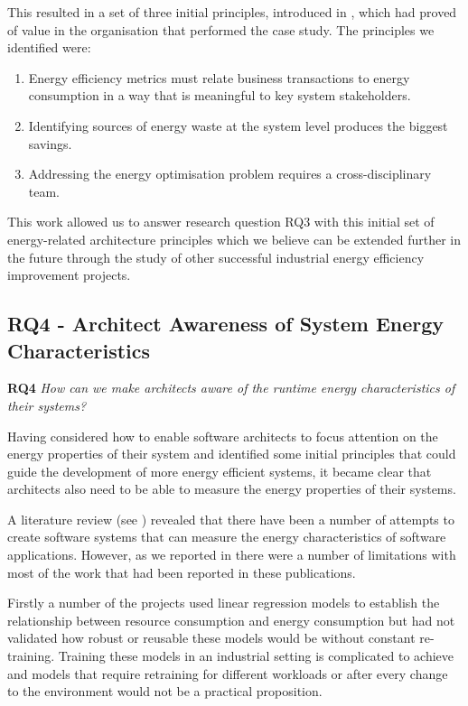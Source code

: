 This resulted in a set of three initial principles, introduced in , which had proved of value in the organisation that performed the case study.  The principles we identified were:
\begin{enumerate}
	\item Energy efficiency metrics must relate business transactions to energy consumption in a way that is meaningful to key system stakeholders.
	\item Identifying sources of energy waste at the system level produces the biggest savings.
	\item Addressing the energy optimisation problem requires a cross-disciplinary team.
\end{enumerate}

This work allowed us to answer research question RQ3 with this initial set of energy-related architecture principles which we believe can be extended further in the future through the study of other successful industrial energy efficiency improvement projects.

\subsection{RQ4 - Architect Awareness of System Energy Characteristics}

\textbf{RQ4} \emph{How can we make architects aware of the runtime energy characteristics of their systems?}

Having considered how to enable software architects to focus attention on the energy properties of their system and identified some initial principles that could guide the development of more energy efficient systems, it became clear that architects also need to be able to measure the energy properties of their systems.

A literature review (see ) revealed that there have been a number of attempts to create software systems that can measure the energy characteristics of software applications.  However, as we reported in  there were a number of limitations with most of the work that had been reported in these publications.  

Firstly a number of the projects used linear regression models to establish the relationship between resource consumption and energy consumption but had not validated how robust or reusable these models would be without constant re-training.  Training these models in an industrial setting is complicated to achieve and models that require retraining for different workloads or after every change to the environment would not be a practical proposition.  

